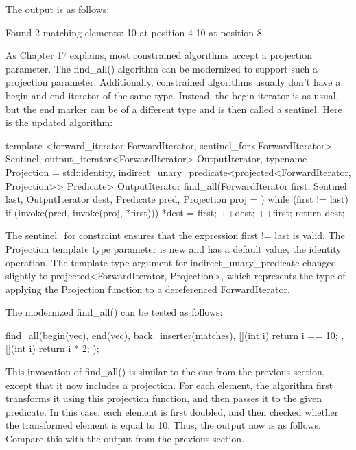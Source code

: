 The output is as follows:

\begin{shell}
Found 2 matching elements:
10 at position 4
10 at position 8
\end{shell}


As Chapter 17 explains, most constrained algorithms accept a projection parameter. The find\_all() algorithm can be modernized to support such a projection parameter. Additionally, constrained algorithms usually don’t have a begin and end iterator of the same type. Instead, the begin iterator is as usual, but the end marker can be of a different type and is then called a sentinel. Here is the updated algorithm:

\begin{cpp}
template <forward_iterator ForwardIterator,
    sentinel_for<ForwardIterator> Sentinel,
    output_iterator<ForwardIterator> OutputIterator,
    typename Projection = std::identity,
    indirect_unary_predicate<projected<ForwardIterator, Projection>> Predicate>
OutputIterator find_all(ForwardIterator first, Sentinel last,
                        OutputIterator dest, Predicate pred, Projection proj = {})
{
    while (first != last) {
        if (invoke(pred, invoke(proj, *first))) {
            *dest = first;
            ++dest;
        }
        ++first;
    }
    return dest;
}
\end{cpp}

The sentinel\_for constraint ensures that the expression first != last is valid. The Projection template type parameter is new and has a default value, the identity operation. The template type argument for indirect\_unary\_predicate changed slightly to projected<ForwardIterator, Projection>, which represents the type of applying the Projection function to a dereferenced ForwardIterator.

The modernized find\_all() can be tested as follows:

\begin{cpp}
find_all(begin(vec), end(vec), back_inserter(matches),
    [](int i) { return i == 10; },
    [](int i) { return i * 2; });
\end{cpp}

This invocation of find\_all() is similar to the one from the previous section, except that it now includes a projection. For each element, the algorithm first transforms it using this projection function, and then passes it to the given predicate. In this case, each element is first doubled, and then checked whether the transformed element is equal to 10. Thus, the output now is as follows. Compare this with the output from the previous section.

